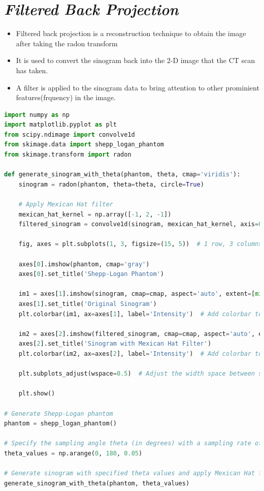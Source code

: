 \documentclass{article}
\begin{document}
\section{\textit{Filtered Back Projection}}
\begin{itemize}
    \item Filtered back projection is a reconstruction technique to obtain the image after taking the radon transform
    \item It is used to convert the sinogram back into the 2-D image that the CT scan has taken.
    \item A filter is applied to the sinogram data to bring attention to other prominient features(frquency) in the image.
\end{itemize}
\begin{lstlisting}[language=Python, style=python, caption={Python code for generating sinogram with  Mexican Hat filter}]
import numpy as np
import matplotlib.pyplot as plt
from scipy.ndimage import convolve1d
from skimage.data import shepp_logan_phantom
from skimage.transform import radon

def generate_sinogram_with_theta(phantom, theta, cmap='viridis'):
    sinogram = radon(phantom, theta=theta, circle=True)

    # Apply Mexican Hat filter
    mexican_hat_kernel = np.array([-1, 2, -1])
    filtered_sinogram = convolve1d(sinogram, mexican_hat_kernel, axis=0, mode='constant', cval=0)

    fig, axes = plt.subplots(1, 3, figsize=(15, 5))  # 1 row, 3 columns

    axes[0].imshow(phantom, cmap='gray')
    axes[0].set_title('Shepp-Logan Phantom')

    im1 = axes[1].imshow(sinogram, cmap=cmap, aspect='auto', extent=[min(theta), max(theta), 0, sinogram.shape[0]])
    axes[1].set_title('Original Sinogram')
    plt.colorbar(im1, ax=axes[1], label='Intensity')  # Add colorbar to the first subplot

    im2 = axes[2].imshow(filtered_sinogram, cmap=cmap, aspect='auto', extent=[min(theta), max(theta), 0, filtered_sinogram.shape[0]])
    axes[2].set_title('Sinogram with Mexican Hat Filter')
    plt.colorbar(im2, ax=axes[2], label='Intensity')  # Add colorbar to the second subplot

    plt.subplots_adjust(wspace=0.5)  # Adjust the width space between subplots

    plt.show()

# Generate Shepp-Logan phantom
phantom = shepp_logan_phantom()

# Specify the sampling angle theta (in degrees) with a sampling rate of 0.05 degrees
theta_values = np.arange(0, 180, 0.05)

# Generate sinogram with specified theta values and apply Mexican Hat filter
generate_sinogram_with_theta(phantom, theta_values)
\end{lstlisting}
\end{document}
